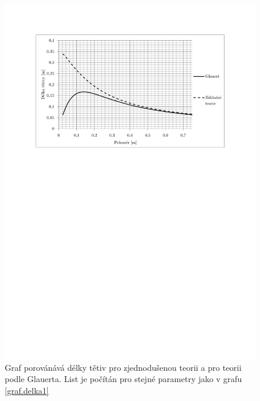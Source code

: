 		
		\begin{figure}[h]
						\centering
							\includegraphics[]{obrazky/grafy/glauert1}
						\caption{Graf porovánává délky tětiv pro zjednodušenou teorii a pro teorii podle Glauerta. List je počítán pro stejné parametry jako v grafu \ref{graf.delka1}}
						\label{graf.glauert1}
		\end{figure}

